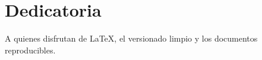 \section*{Dedicatoria}
A quienes disfrutan de \LaTeX{}, el versionado limpio y los documentos reproducibles.

